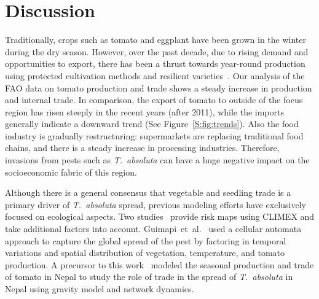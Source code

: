 \documentclass[11pt]{article}
\newcommand{\tuta}{\emph{T.~absoluta}}
\theoremstyle{definition}
\begin{document}
\section{Discussion}
Traditionally, crops such as tomato and eggplant have been grown in the
winter during the dry season. However, over the past decade, due to rising
demand and opportunities to export, there has been a thrust towards
year-round production using protected cultivation methods and resilient
varieties~\cite{ali2001}. Our analysis of the FAO data on
tomato production and trade shows a steady increase in production and
internal trade. In comparison, the export of tomato to outside of the focus
region has risen steeply in the recent years (after 2011), while the
imports generally indicate a downward trend (See
Figure~\ref{S:fig:trends}). Also the food industry is gradually
restructuring: supermarkets are replacing traditional food chains, and
there is a steady increase in processing industries. Therefore, invasions
from pests such as \tuta{} can have a huge negative impact on the
socioeconomic fabric of this region.

Although there is a general consensus that vegetable and seedling trade is a
primary driver of \tuta{} spread, previous modeling efforts have
exclusively focused on ecological aspects. Two
studies~\cite{desneux2010biological,tonnang2015identification} provide risk
maps using CLIMEX and take additional factors into account.
Guimapi~et~al.~\cite{guimapi2016modeling} used a
cellular automata approach to capture the global spread of the pest by
factoring in temporal variations and spatial distribution of vegetation,
temperature, and tomato production. 
A precursor to this work~\cite{venkatramanan2017towards} modeled the seasonal
production and trade of tomato in Nepal to study the role of trade in the
spread of \tuta{} in Nepal using gravity model and network dynamics. 
\end{document}
